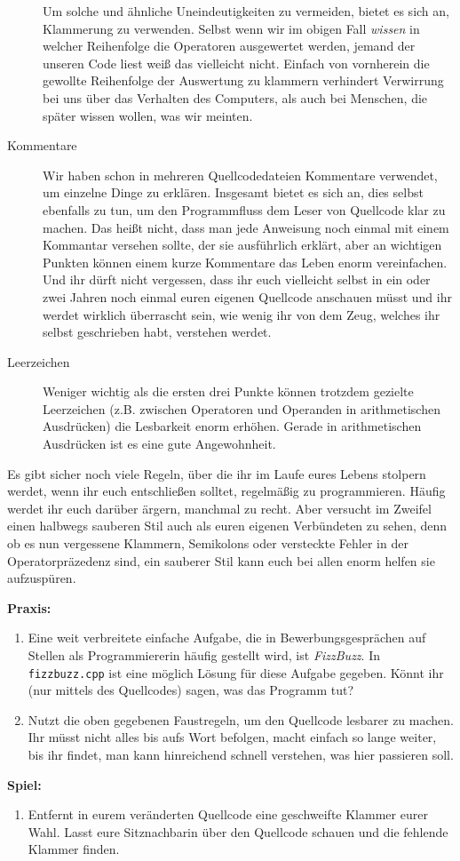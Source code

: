 \begin{description}
        Um solche und ähnliche Uneindeutigkeiten zu vermeiden, bietet es sich
        an, Klammerung zu verwenden. Selbst wenn wir im obigen Fall
        \emph{wissen} in welcher Reihenfolge die Operatoren ausgewertet werden,
        jemand der unseren Code liest weiß das vielleicht nicht. Einfach von
        vornherein die gewollte Reihenfolge der Auswertung zu klammern
        verhindert Verwirrung bei uns über das Verhalten des Computers, als
        auch bei Menschen, die später wissen wollen, was wir meinten.
    \item[Kommentare]
        Wir haben schon in mehreren Quellcodedateien Kommentare verwendet, um
        einzelne Dinge zu erklären. Insgesamt bietet es sich an, dies selbst
        ebenfalls zu tun, um den Programmfluss dem Leser von Quellcode klar zu
        machen. Das heißt nicht, dass man jede Anweisung noch einmal mit einem
        Kommantar versehen sollte, der sie ausführlich erklärt, aber an
        wichtigen Punkten können einem kurze Kommentare das Leben enorm
        vereinfachen. Und ihr dürft nicht vergessen, dass ihr euch vielleicht
        selbst in ein oder zwei Jahren noch einmal euren eigenen Quellcode
        anschauen müsst und ihr werdet wirklich überrascht sein, wie wenig ihr
        von dem Zeug, welches ihr selbst geschrieben habt, verstehen werdet.
    \item[Leerzeichen]
        Weniger wichtig als die ersten drei Punkte können trotzdem gezielte
        Leerzeichen (z.B. zwischen Operatoren und Operanden in arithmetischen
        Ausdrücken) die Lesbarkeit enorm erhöhen. Gerade in arithmetischen
        Ausdrücken ist es eine gute Angewohnheit.
\end{description}

Es gibt sicher noch viele Regeln, über die ihr im Laufe eures Lebens stolpern
werdet, wenn ihr euch entschließen solltet, regelmäßig zu programmieren. Häufig
werdet ihr euch darüber ärgern, manchmal zu recht. Aber versucht im Zweifel
einen halbwegs sauberen Stil auch als euren eigenen Verbündeten zu sehen, denn
ob es nun vergessene Klammern, Semikolons oder versteckte Fehler in der
Operatorpräzedenz sind, ein sauberer Stil kann euch bei allen enorm helfen sie
aufzuspüren.

\textbf{Praxis:}
\begin{enumerate}
    \item Eine weit verbreitete einfache Aufgabe, die in Bewerbungsgesprächen
        auf Stellen als Programmiererin häufig gestellt wird, ist
        \emph{FizzBuzz}. In \texttt{fizzbuzz.cpp} ist eine möglich Lösung für
        diese Aufgabe gegeben. Könnt ihr (nur mittels des Quellcodes) sagen,
        was das Programm tut?
    \item Nutzt die oben gegebenen Faustregeln, um den Quellcode lesbarer zu
        machen. Ihr müsst nicht alles bis aufs Wort befolgen, macht einfach so
        lange weiter, bis ihr findet, man kann hinreichend schnell verstehen,
        was hier passieren soll.
\end{enumerate}


\textbf{Spiel:}
\begin{enumerate}
    \item Entfernt in eurem veränderten Quellcode eine geschweifte Klammer
        eurer Wahl. Lasst eure Sitznachbarin über den Quellcode schauen und die
        fehlende Klammer finden.
\end{enumerate}
